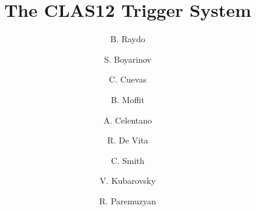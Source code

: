 \title{The CLAS12 Trigger System}

\author[A]{B. Raydo}
\author[A]{S. Boyarinov}
\author[A]{C. Cuevas}
\author[A]{B. Moffit}
\author[B]{A. Celentano}
\author[B]{R. De Vita}
\author[A]{C. Smith}
\author[A]{V. Kubarovsky}
\author[A]{R. Paremuzyan}

\address[A]{Thomas Jefferson National Accelerator Facility, Newport News, VA, USA}
\address[B]{INFN, Milan, Italy}
